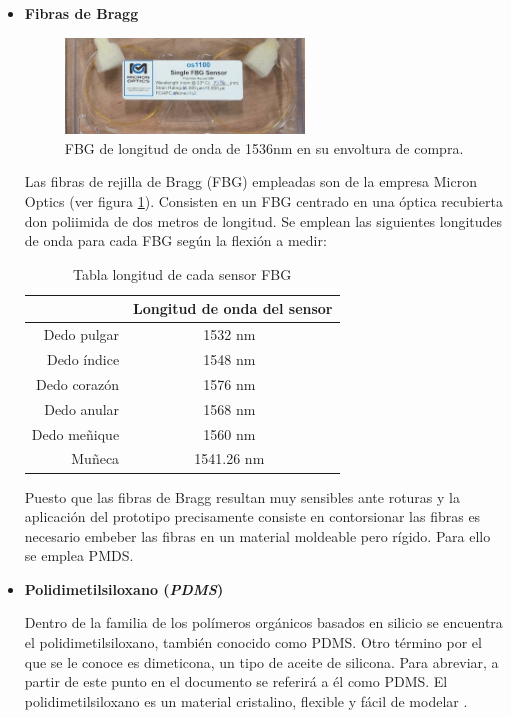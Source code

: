 \begin{itemize}


\item \textbf{Fibras de Bragg}
\begin{figure}[H]
	\centering
	\includegraphics[width=0.60\textwidth]{./img/fibraBraggpaquete2}
	\caption{FBG de longitud de onda de 1536nm en su envoltura de compra.} \label{fig:FBGpaquete}
\end{figure}

Las fibras de rejilla de Bragg (FBG) empleadas son de la empresa Micron Optics (ver figura \ref{fig:FBGpaquete}). Consisten en un FBG centrado en una óptica recubierta don poliimida de dos metros de longitud. Se emplean las siguientes longitudes de onda para cada FBG según la flexión a medir:

\begin{table}[H]
	\centering
	\begin{tabular}[t]{|r|c|}
		\hline
		& Longitud de onda del sensor\\
		\hline
		\hline
		Dedo pulgar & 1532 nm \\
		\hline
		Dedo índice & 1548 nm \\
		\hline
		Dedo corazón & 1576 nm \\
		\hline
		Dedo anular & 1568 nm \\
		\hline
		Dedo meñique & 1560 nm \\
		\hline
		Muñeca & 1541.26 nm \\
		\hline
	\end{tabular}
	\caption{Tabla longitud de cada sensor FBG}
	\label{tabla:mmedidas 80 cm}
\end{table}

Puesto que las fibras de Bragg resultan muy sensibles ante roturas y la aplicación del prototipo precisamente consiste en contorsionar las fibras es necesario embeber las fibras en un material moldeable pero rígido. Para ello se emplea PMDS.
 
 \clearpage

	\item \textbf{Polidimetilsiloxano (\textit{PDMS})}
	
	Dentro de la familia de los polímeros orgánicos basados en silicio se encuentra el polidimetilsiloxano, también conocido como PDMS. Otro término por el que se le conoce es dimeticona, un tipo de aceite de silicona. Para abreviar, a partir de este punto en el documento se referirá a él como PDMS. El polidimetilsiloxano es un material cristalino, flexible y fácil de modelar \cite{propPDMS}.
	

\end{itemize}
